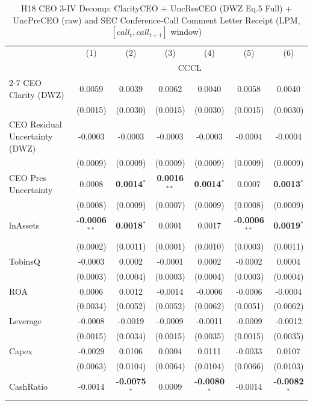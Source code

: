 \documentclass[11pt,a4paper]{article}
\begin{document}
\clearpage
\begin{table}[htbp]
\centering
\caption{H18 CEO 3-IV Decomp: ClarityCEO + UncResCEO (DWZ Eq.5 Full) + UncPreCEO (raw) and SEC Conference-Call Comment Letter Receipt (LPM, $[\textit{call}_t, \textit{call}_{t+1}]$ window)}
\label{tab:h18_ceo2_decomp}
\scriptsize
\begin{tabular}{lcccccc}
\toprule
 & (1) & (2) & (3) & (4) & (5) & (6) \\
 & \multicolumn{6}{c}{CCCL} \\
\cmidrule(lr){2-7}
\midrule
CEO Clarity (DWZ) & 0.0059 & 0.0039 & 0.0062 & 0.0040 & 0.0058 & 0.0040 \\
 & (0.0015) & (0.0030) & (0.0015) & (0.0030) & (0.0015) & (0.0030) \\
CEO Residual Uncertainty (DWZ) & -0.0003 & -0.0003 & -0.0003 & -0.0003 & -0.0004 & -0.0004 \\
 & (0.0009) & (0.0009) & (0.0009) & (0.0009) & (0.0009) & (0.0009) \\
CEO Pres Uncertainty & 0.0008 & \textbf{0.0014}$^{*}$ & \textbf{0.0016}$^{**}$ & \textbf{0.0014}$^{*}$ & 0.0007 & \textbf{0.0013}$^{*}$ \\
 & (0.0008) & (0.0009) & (0.0007) & (0.0009) & (0.0008) & (0.0009) \\
\midrule
lnAssets & \textbf{-0.0006}$^{**}$ & \textbf{0.0018}$^{*}$ & 0.0001 & 0.0017 & \textbf{-0.0006}$^{**}$ & \textbf{0.0019}$^{*}$ \\
 & (0.0002) & (0.0011) & (0.0001) & (0.0010) & (0.0003) & (0.0011) \\
TobinsQ & -0.0003 & 0.0002 & -0.0001 & 0.0002 & -0.0002 & 0.0004 \\
 & (0.0003) & (0.0004) & (0.0003) & (0.0004) & (0.0003) & (0.0004) \\
ROA & 0.0006 & 0.0012 & -0.0014 & -0.0006 & -0.0006 & -0.0004 \\
 & (0.0034) & (0.0052) & (0.0052) & (0.0062) & (0.0051) & (0.0062) \\
Leverage & -0.0008 & -0.0019 & -0.0009 & -0.0011 & -0.0009 & -0.0012 \\
 & (0.0015) & (0.0034) & (0.0015) & (0.0035) & (0.0015) & (0.0035) \\
Capex & -0.0029 & 0.0106 & 0.0004 & 0.0111 & -0.0033 & 0.0107 \\
 & (0.0063) & (0.0104) & (0.0064) & (0.0104) & (0.0066) & (0.0103) \\
CashRatio & -0.0014 & \textbf{-0.0075}$^{*}$ & 0.0009 & \textbf{-0.0080}$^{*}$ & -0.0014 & \textbf{-0.0082}$^{*}$ \\

\end{tabular}
\end{table}
\end{document}
